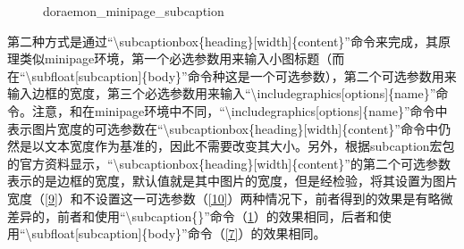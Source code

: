 \documentclass{article}
\begin{document}
\begin{figure}[htbp]
{\begin{minipage}{.25\textwidth}
        \end{minipage}
    }
    \caption{doraemon\_minipage\_subcaption}
    \label{8}
    \end{figure}

    第二种方式是通过``\textbackslash subcaptionbox\{heading\}[width]\{content\}''命令来完成，其原理类似minipage环境，第一个必选参数用来输入小图标题（而在``\textbackslash subfloat[subcaption]\{body\}''命令种这是一个可选参数），第二个可选参数用来输入边框的宽度，第三个必选参数用来输入``\textbackslash includegraphics[options]\{name\}''命令。注意，和在minipage环境中不同，``\textbackslash includegraphics[options]\{name\}''命令中表示图片宽度的可选参数在``\textbackslash subcaptionbox\{heading\}[width]\{content\}''命令中仍然是以文本宽度作为基准的，因此不需要改变其大小。另外，根据subcaption宏包的官方资料显示，``\textbackslash subcaptionbox\{heading\}[width]\{content\}''的第二个可选参数表示的是边框的宽度，默认值就是其中图片的宽度，但是经检验，将其设置为图片宽度（\ref{9}）和不设置这一可选参数（\ref{10}）两种情况下，前者得到的效果是有略微差异的，前者和使用``\textbackslash subcaption\{\}''命令（\ref{8}）的效果相同，后者和使用``\textbackslash subfloat[subcaption]\{body\}''命令（\ref{7}）的效果相同。
\end{document}
